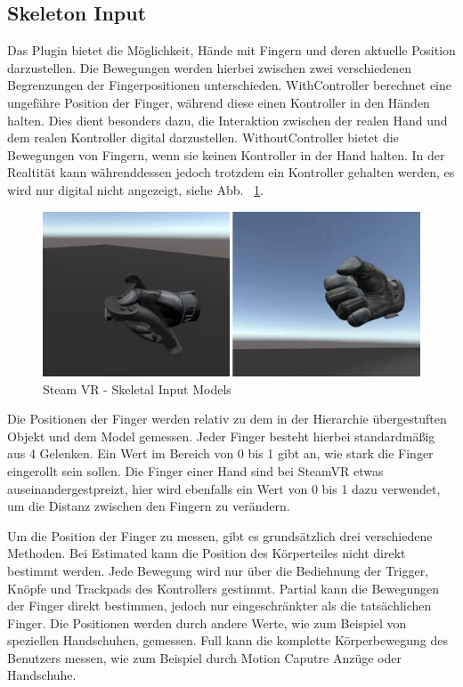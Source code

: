 \subsection{Skeleton Input}\label{subsec:skeleton-input}
Das Plugin bietet die Möglichkeit, Hände mit Fingern und deren aktuelle Position darzustellen.
Die Bewegungen werden hierbei zwischen zwei verschiedenen Begrenzungen der Fingerpositionen unterschieden.
WithController berechnet eine ungefähre Position der Finger, während diese einen Kontroller in den Händen halten.
Dies dient besonders dazu, die Interaktion zwischen der realen Hand und dem realen Kontroller digital darzustellen.
WithoutController bietet die Bewegungen von Fingern, wenn sie keinen Kontroller in der Hand halten.
In der Realtität kann währenddessen jedoch trotzdem ein Kontroller gehalten werden, es wird nur digital nicht angezeigt, siehe Abb. ~\ref{fig:steamvr_skeletal_input_models}.
\begin {figure}
    \centering
    \includegraphics[scale=1]{pics/steamVR_skeletal_input_models}
    \caption{Steam VR - Skeletal Input Models}
    \label{fig:steamvr_skeletal_input_models}
\end {figure}
Die Positionen der Finger werden relativ zu dem in der Hierarchie übergestuften Objekt und dem Model gemessen.
Jeder Finger besteht hierbei standardmäßig aus 4 Gelenken.
Ein Wert im Bereich von 0 bis 1 gibt an, wie stark die Finger eingerollt sein sollen.
Die Finger einer Hand sind bei SteamVR etwas auseinandergestpreizt, hier wird ebenfalls ein Wert von 0 bis 1 dazu verwendet, um die Distanz zwischen den Fingern zu verändern.

Um die Position der Finger zu messen, gibt es grundsätzlich drei verschiedene Methoden.
Bei Estimated kann die Position des Körperteiles nicht direkt bestimmt werden.
Jede Bewegung wird nur über die Bediehnung der Trigger, Knöpfe und Trackpads des Kontrollers gestimmt.
Partial kann die Bewegungen der Finger direkt bestimmen, jedoch nur eingeschränkter als die tatsächlichen Finger.
Die Positionen werden durch andere Werte, wie zum Beispiel von speziellen Handschuhen, gemessen.
Full kann die komplette Körperbewegung des Benutzers messen, wie zum Beispiel durch Motion Caputre Anzüge oder Handschuhe.

